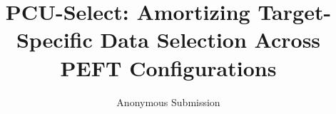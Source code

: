 \documentclass[letterpaper]{article} %
\title{PCU-Select: Amortizing Target-Specific Data Selection Across PEFT Configurations}
\author{
    Anonymous Submission
}
\begin{document}
\maketitle

\begin{abstract}

\end{abstract}

%









%

%
\end{document}
